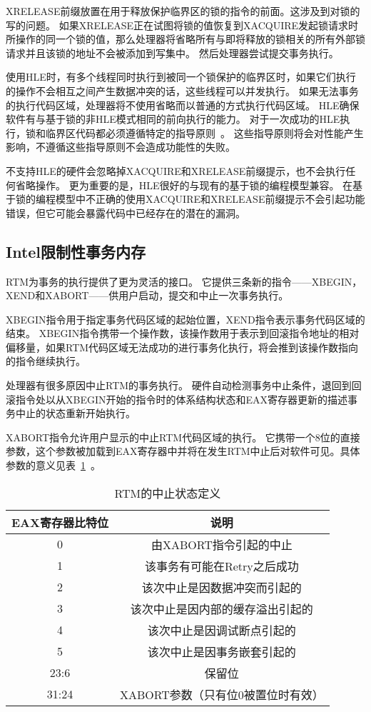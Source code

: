 XRELEASE前缀放置在用于释放保护临界区的锁的指令的前面。这涉及到对锁的写的问题。
如果XRELEASE正在试图将锁的值恢复到XACQUIRE发起锁请求时所操作的同一个锁的值，那么处理器将省略所有与即将释放的锁相关的所有外部锁请求并且该锁的地址不会被添加到写集中。
然后处理器尝试提交事务执行。

使用HLE时，有多个线程同时执行到被同一个锁保护的临界区时，如果它们执行的操作不会相互之间产生数据冲突的话，这些线程可以并发执行。
如果无法事务的执行代码区域，处理器将不使用省略而以普通的方式执行代码区域。
HLE确保软件有与基于锁的非HLE模式相同的前向执行的能力。
对于一次成功的HLE执行，锁和临界区代码都必须遵循特定的指导原则~\cite{Intel2015Intel}。
这些指导原则将会对性能产生影响，不遵循这些指导原则不会造成功能性的失败。

不支持HLE的硬件会忽略掉XACQUIRE和XRELEASE前缀提示，也不会执行任何省略操作。
更为重要的是，HLE很好的与现有的基于锁的编程模型兼容。
在基于锁的编程模型中不正确的使用XACQUIRE和XRELEASE前缀提示不会引起功能错误，但它可能会暴露代码中已经存在的潜在的漏洞。

\subsection{Intel限制性事务内存}
RTM为事务的执行提供了更为灵活的接口。
它提供三条新的指令——XBEGIN， XEND和XABORT——供用户启动，提交和中止一次事务执行。

XBEGIN指令用于指定事务代码区域的起始位置，XEND指令表示事务代码区域的结束。
XBEGIN指令携带一个操作数，该操作数用于表示到回滚指令地址的相对偏移量，如果RTM代码区域无法成功的进行事务化执行，将会推到该操作数指向的指令继续执行。

处理器有很多原因中止RTM的事务执行。
硬件自动检测事务中止条件，退回到回滚指令处以从XBEGIN开始的指令时的体系结构状态和EAX寄存器更新的描述事务中止的状态重新开始执行。

XABORT指令允许用户显示的中止RTM代码区域的执行。
它携带一个8位的直接参数，这个参数被加载到EAX寄存器中并将在发生RTM中止后对软件可见。具体参数的意义见表~\ref{tab:rtm_status}~。

\begin{table}[htbp]
  \centering
  \caption{RTM的中止状态定义}
  \label{tab:rtm_status}
  \begin{tabular}{cc}
    \toprule
       EAX寄存器比特位 & 说明 \\
    \midrule
      0     & 由XABORT指令引起的中止 \\
      1     & 该事务有可能在Retry之后成功\\
      2     & 该次中止是因数据冲突而引起的 \\
      3     & 该次中止是因内部的缓存溢出引起的\\
      4     & 该次中止是因调试断点引起的 \\
      5     & 该次中止是因事务嵌套引起的 \\
      23:6  & 保留位\\
      31:24 & XABORT参数（只有位0被置位时有效） \\
    \bottomrule
  \end{tabular}
\end{table}


